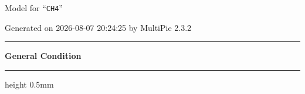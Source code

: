 \documentclass[fleqn,10pt,landscape]{jsarticle}
\begin{document}
\setcounter{MaxMatrixCols}{32}

\renewcommand{\tablename}{Table~}
\renewcommand{\figurename}{Figure~}
\setlength{\baselineskip}{16pt}
\setlength{\parindent}{0pt}
\setlength{\mathindent}{0pt}
\footnotesize
\begin{center}
\LARGE
Model for ``\texttt{CH4}''
\end{center}
\begin{flushright}
Generated on 2026-08-07 20:24:25 by MultiPie 2.3.2
\end{flushright}
\setlength{\baselineskip}{16pt}
\footnotesize
\vspace{5mm}
\noindent \rule[0.5mm]{5mm}{0.5mm}\hspace{3mm}\textbf{General Condition}\hspace{3mm}\leaders\hrule height 0.5mm\hfill\kern0pt
\vspace{3mm}
\end{document}
